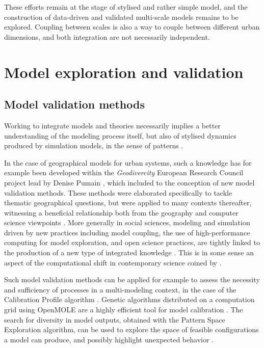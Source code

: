 These efforts remain at the stage of stylised and rather simple model, and the construction of data-driven and validated multi-scale models remains to be explored. Coupling between scales is also a way to couple between different urban dimensions, and both integration are not necessarily independent.


\section{Model exploration and validation}



\subsection{Model validation methods}

Working to integrate models and theories necessarily implies a better understanding of the modeling process itself, but also of stylised dynamics produced by simulation models, in the sense of patterns \cite{grimm2005pattern}.

In the case of geographical models for urban systems, such a knowledge has for example been developed within the \emph{Geodivercity} European Research Council project lead by Denise Pumain \cite{pumain2017urban}, which included to the conception of new model validation methods. These methods were elaborated specifically to tackle thematic geographical questions, but were applied to many contexts thereafter, witnessing a beneficial relationship both from the geography and computer science viewpoints \cite{raimbault2019methods}. More generally in social sciences, modeling and simulation driven by new practices including model coupling, the use of high-performance computing for model exploration, and open science practices, are tightly linked to the production of a new type of integrated knowledge \cite{banos2013pour}. This is in some sense an aspect of the computational shift in contemporary science coined by \cite{arthur2014complexity}.


Such model validation methods can be applied for example to assess the necessity and sufficiency of processes in a multi-modeling context, in the case of the Calibration Profile algorithm \cite{reuillon2015new}. Genetic algorithms distributed on a computation grid using OpenMOLE are a highly efficient tool for model calibration \cite{schmitt2015half}. The search for diversity in model outputs, obtained with the Pattern Space Exploration algorithm, can be used to explore the space of feasible configurations a model can produce, and possibly highlight unexpected behavior \cite{cherel2015beyond}.


